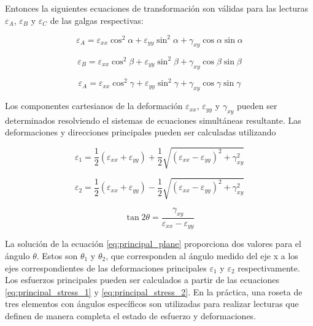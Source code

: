 Entonces la siguientes ecuaciones de transformación son válidas para las lecturas $\varepsilon_{A}$, 
$\varepsilon_{B}$ y $\varepsilon_{C}$ de las galgas respectivas:

\begin{equation}
\varepsilon_A = \varepsilon_{xx} \cos^2\alpha + \varepsilon_{yy} \sin^2\alpha + \gamma_{xy} \cos\alpha \sin\alpha
\end{equation}

\begin{equation}
\varepsilon_B = \varepsilon_{xx} \cos^2\beta + \varepsilon_{yy} \sin^2\beta + \gamma_{xy} \cos\beta \sin\beta
\end{equation}

\begin{equation}
\varepsilon_A = \varepsilon_{xx} \cos^2\gamma + \varepsilon_{yy} \sin^2\gamma + \gamma_{xy} \cos\gamma \sin\gamma
\end{equation}

Los componentes cartesianos de la deformación $\varepsilon_{xx}$, $\varepsilon_{yy}$ y $\gamma_{xy}$ pueden 
ser determinados resolviendo el sistemas de ecuaciones simultáneas resultante. Las deformaciones 
y direcciones principales pueden ser calculadas utilizando 

\begin{equation}\label{eq:principal_strain_1}
\varepsilon_1 = \frac{1}{2} \left( \varepsilon_{xx} + \varepsilon_{yy} \right) + 
\frac{1}{2} \sqrt{\left( \varepsilon_{xx} - \varepsilon_{yy} \right)^2 + \gamma_{xy}^2 }
\end{equation}

\begin{equation}\label{eq:principal_strain_2}
\varepsilon_2 = \frac{1}{2} \left( \varepsilon_{xx} + \varepsilon_{yy} \right) - 
\frac{1}{2} \sqrt{\left( \varepsilon_{xx} - \varepsilon_{yy} \right)^2 + \gamma_{xy}^2 }
\end{equation}

\begin{equation}\label{eq:principal_plane}
\tan 2\theta = \frac{\gamma_{xy}}{\varepsilon_{xx} - \varepsilon_{yy}}
\end{equation}

La solución de la ecuación \ref{eq:principal_plane} proporciona dos valores para el ángulo $\theta$. Estos son 
$\theta_1$ y $\theta_2$, que corresponden al ángulo medido del eje x a los ejes correspondientes de las 
deformaciones principales $\varepsilon_1$ y $\varepsilon_2$ respectivamente.\\

Los esfuerzos principales pueden ser calculados a partir de las ecuaciones \ref{eq:principal_stress_1} y 
\ref{eq:principal_stress_2}. En la práctica, una roseta de tres elementos con ángulos específicos son 
utilizadas para realizar lecturas que definen de manera completa el estado de esfuerzo y deformaciones.
